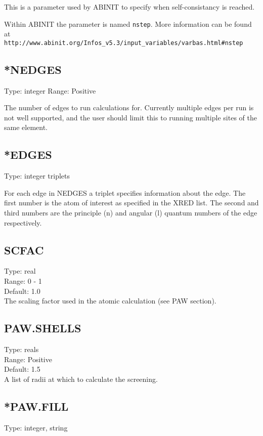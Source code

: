 \documentclass[12pt]{article}
\begin{document}
This is a parameter used by \textsc{ABINIT} to specify when 
self-consistancy is reached. 

Within \textsc{ABINIT} the parameter is named \verb|nstep|.
More information can be found at 
\\ 
\verb|http://www.abinit.org/Infos_v5.3/input_variables/varbas.html#nstep|

\subsection{*NEDGES}
Type: integer
Range: Positive

The number of edges to run calculations for. Currently multiple edges per run is not well supported, and 
the user should limit this to running multiple sites of the same element.

\subsection{*EDGES}
Type: integer triplets

For each edge in NEDGES a triplet specifies information about the edge. The first number is the atom of
 interest as specified in the XRED list. The second and third numbers are the principle (n) and angular (l)
quantum numbers of the edge respectively. 

\subsection{SCFAC}
Type: real \\
Range: 0 - 1 \\
Default: 1.0 \\

The scaling factor used in the atomic calculation (see PAW section).

\subsection{PAW.SHELLS}
Type: reals \\
Range: Positive \\
Default: 1.5 \\

A list of radii at which to calculate the screening. 

\subsection{*PAW.FILL}
Type: integer, string
\end{document}
